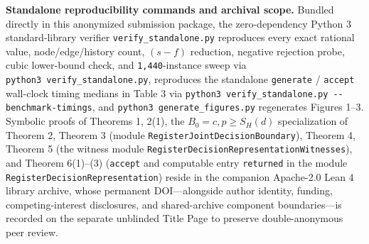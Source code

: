 \documentclass[11pt,letterpaper]{article}
\begin{document}
\textbf{Standalone reproducibility commands and archival scope.} Bundled
directly in this anonymized submission package, the zero-dependency
Python 3 standard-library verifier \texttt{verify\_standalone.py}
reproduces every exact rational value, node/edge/history count,
\((s - f)\) reduction, negative rejection probe, cubic lower-bound
check, and \texttt{1,440}-instance sweep via
\texttt{python3\ verify\_standalone.py}, reproduces the standalone
\texttt{generate} / \texttt{accept} wall-clock timing medians in Table 3
via \texttt{python3\ verify\_standalone.py\ -\/-benchmark-timings}, and
\texttt{python3\ generate\_figures.py} regenerates Figures 1--3.
Symbolic proofs of Theorems 1, 2(1), the \(B_0 = c, p \ge S_H(d)\)
specialization of Theorem 2, Theorem 3 (module
\texttt{RegisterJointDecisionBoundary}), Theorem 4, Theorem 5 (the
witness module \texttt{RegisterDecisionRepresentationWitnesses}), and
Theorem 6(1)--(3) (\texttt{accept} and computable entry
\texttt{returned} in the module \texttt{RegisterDecisionRepresentation})
reside in the companion Apache-2.0 Lean 4 library archive, whose
permanent DOI---alongside author identity, funding, competing-interest
disclosures, and shared-archive component boundaries---is recorded on
the separate unblinded Title Page to preserve double-anonymous peer
review.

\clearpage
\begingroup
\nolinenumbers
{}
\small
\setlength{\bibsep}{4.5pt}


\endgroup
\end{document}
